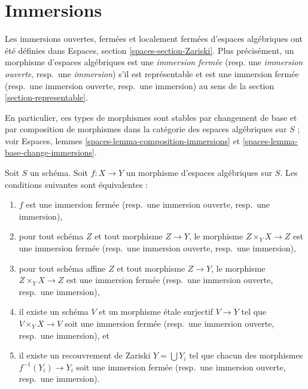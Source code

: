 \section{Immersions}
\label{section-immersions}

\noindent
Les immersions ouvertes, fermées et localement fermées d'espaces algébriques ont été définies dans
Espaces, section \ref{spaces-section-Zariski}.
Plus précisément, un morphisme d'espaces algébriques est une
{\it immersion fermée} (resp. une {\it immersion ouverte}, resp.\ une {\it immersion})
s'il est représentable et est une immersion fermée (resp.\ une immersion ouverte,
resp.\ une immersion) au sens de la section \ref{section-representable}.

\medskip\noindent
En particulier, ces types de morphismes sont stables par changement de base
et par composition de morphismes dans la catégorie des espaces
algébriques sur $S$ ; voir
Espaces, lemmes \ref{spaces-lemma-composition-immersions} et
\ref{spaces-lemma-base-change-immersions}.

\begin{lemma}
\label{lemma-closed-immersion-local}
Soit $S$ un schéma. Soit $f : X \to Y$ un morphisme d'espaces algébriques
sur $S$. Les conditions suivantes sont équivalentes :
\begin{enumerate}
\item $f$ est une immersion fermée (resp.\ une immersion ouverte, resp.\ une immersion),
\item pour tout schéma $Z$ et tout morphisme $Z \to Y$, le morphisme
$Z \times_Y X \to Z$ est une immersion fermée (resp.\ une immersion ouverte,
resp.\ une immersion),
\item pour tout schéma affine $Z$ et tout morphisme
$Z \to Y$, le morphisme $Z \times_Y X \to Z$ est une immersion fermée
(resp.\ une immersion ouverte, resp.\ une immersion),
\item il existe un schéma $V$ et un morphisme \'etale surjectif
$V \to Y$ tel que $V \times_Y X \to V$ soit une immersion fermée
(resp.\ une immersion ouverte, resp.\ une immersion), et
\item il existe un recouvrement de Zariski $Y = \bigcup Y_i$ tel que
chacun des morphismes $f^{-1}(Y_i) \to Y_i$ soit une immersion fermée
(resp.\ une immersion ouverte, resp.\ une immersion).
\end{enumerate}
\end{lemma}

